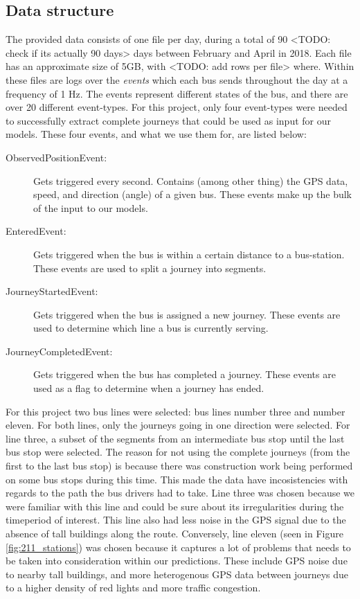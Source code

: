 \subsection{Data structure}
The provided data consists of one file per day, during a total of 90 <TODO: check if its actually 90 days> days between February and April in 2018. Each file has an approximate size of 5GB, with <TODO: add rows per file> where. Within these files are logs over the \textit{events} which each bus sends throughout the day at a frequency of 1 Hz. The events represent different states of the bus, and there are over 20 different event-types. For this project, only four event-types were needed to successfully extract complete journeys that could be used as input for our models. These four events, and what we use them for, are listed below:\\
\begin{description}
\item[ObservedPositionEvent:] Gets triggered every second. Contains (among other thing) the GPS data, speed, and direction (angle) of a given bus. These events make up the bulk of the input to our models.
\item[EnteredEvent:] Gets triggered when the bus is within a certain distance to a bus-station. These events are used to split a journey into segments.
\item[JourneyStartedEvent:] Gets triggered when the bus is assigned a new journey. These events are used to determine which line a bus is currently serving.
\item[JourneyCompletedEvent:] Gets triggered when the bus has completed a journey. These events are used as a flag to determine when a journey has ended.
\end{description}

For this project two bus lines were selected: bus lines number three and number eleven. For both lines, only the journeys going in one direction were selected. For line three, a subset of the segments from an intermediate bus stop until the last bus stop were selected. The reason for not using the complete journeys (from the first to the last bus stop) is because there was construction work being performed on some bus stops during this time. This made the data have incosistencies with regards to the path the bus drivers had to take. Line three was chosen because we were familiar with this line and could be sure about its irregularities during the timeperiod of interest. This line also had less noise in the GPS signal due to the absence of tall buildings along the route. Conversely, line eleven (seen in Figure \ref{fig:211_stations}) was chosen because it captures a lot of problems that needs to be taken into consideration within our predictions. These include GPS noise due to nearby tall buildings, and more heterogenous GPS data between journeys due to a higher density of red lights and more traffic congestion.

